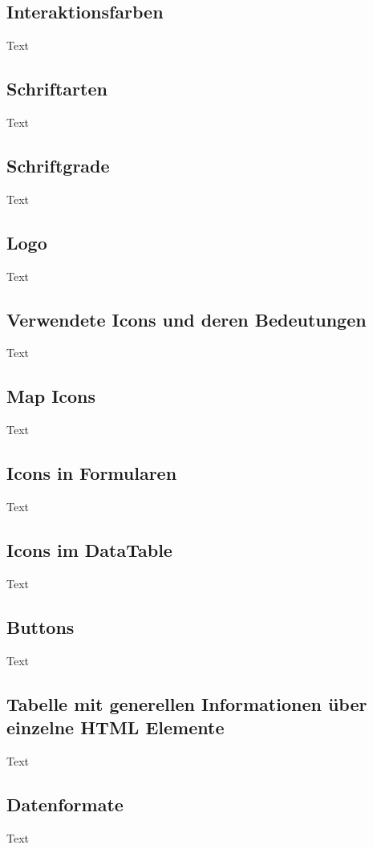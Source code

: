 \subsection{Interaktionsfarben}
Text

\subsection{Schriftarten}
Text

\subsection{Schriftgrade}
Text

\subsection{Logo}
Text

\subsection{Verwendete Icons und deren Bedeutungen}
Text

\subsection{Map Icons}
Text

\subsection{Icons in Formularen}
Text

\subsection{Icons im DataTable}
Text

\subsection{Buttons}
Text

\subsection{Tabelle mit generellen Informationen über einzelne HTML Elemente}
Text

\subsection{Datenformate}
Text



